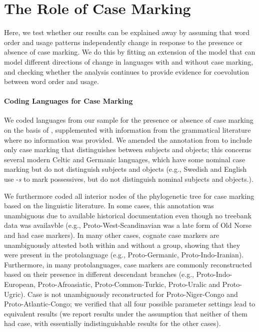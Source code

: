 \documentclass[11pt,a4paper]{article}
\begin{document}
\section{The Role of Case Marking}

Here, we test whether our results can be explained away by assuming that word order and usage patterns independently change in response to the presence or absence of case marking.
We do this by fitting an extension of the model that can model different directions of change in languages with and without case marking, and checking whether the analysis continues to provide evidence for coevolution between word order and usage.

\paragraph{Coding Languages for Case Marking}
We coded languages from our sample for the presence or absence of case marking on the basis of \citep{iggesen2013number}, supplemented with information from the grammatical literature where no information was provided.
We amended the annotation from \citep{iggesen2013number} to include only case marking that distinguishes between subjects and objects; this concerns several modern Celtic and Germanic languages, which have some nominal case marking but do not distinguish subjects and objects (e.g., Swedish and English use -\textit{s} to mark possessives, but do not distinguish nominal subjects and objects.).

We furthermore coded all interior nodes of the phylogenetic tree for case marking based on the linguistic literature.
In some cases, this annotation was unambiguous due to available historical documentation even though no treebank data was availavble (e.g., Proto-West-Scandinavian was a late form of Old Norse and had case markers).
In many other cases, cognate case markers are unambiguously attested both within and without a group, showing that they were present in the protolanguage (e.g., Proto-Germanic, Proto-Indo-Iranian).
Furthermore, in many protolanguages, case markers are commonly reconstructed based on their presence in different descendant branches (e.g., Proto-Indo-European, Proto-Afroasiatic, Proto-Common-Turkic, Proto-Uralic and Proto-Ugric). %
Case is not unambiguously reconstructed for Proto-Niger-Congo and Proto-Atlantic-Congo; we verified that all four possible parameter settings lead to equivalent results (we report results under the assumption that neither of them had case, with essentially indistinguishable results for the other cases).
\end{document}
